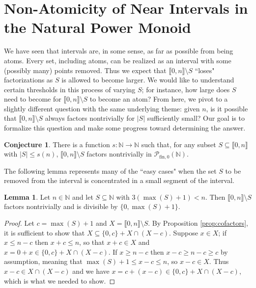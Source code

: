 \documentclass{report}
\newcommand{\NN}{\mathbb{N}}
\renewcommand{\P}{\mathcal{P}}
\newcommand{\llb}{\llbracket}
\newcommand{\rrb}{\rrbracket}
\newcommand{\fin}{\textrm{fin}}
\renewcommand{\:}{\text{:}}
\newcommand{\PN}{{\P_{\fin,0}(\NN)}}
\theoremstyle{definition}
\newtheorem{lemma}[defn]{Lemma}
\newtheorem{conj}[defn]{Conjecture}
\begin{document}

\section{Non-Atomicity of Near Intervals in the Natural Power Monoid} \label{sec:near intervals}

We have seen that intervals are, in some sense, as far as possible from being atoms.
Every set, including atoms, can be realized as an interval with some (possibly many) points removed.  
Thus we expect that $\llb 0,n \rrb \setminus S$ ``loses" factorizations as $S$ is allowed to become larger.  
We would like to understand certain thresholds in this process of varying $S$; for instance, how large does $S$ need to become for $\llb 0,n \rrb \setminus S$ to become an atom?  
From here, we pivot to a slightly different question with the same underlying theme: given $n$, is it possible that $\llb 0,n \rrb \setminus S$ always factors nontrivially for $|S|$ sufficiently small?
Our goal is to formalize this question and make some progress toward determining the answer.

\begin{conj}
There is a function $s:\NN \to \NN$ such that, for any subset $S\subseteq \llb 0,n \rrb$ with $|S| \le s(n)$, $\llb 0,n \rrb \setminus S$ factors nontrivially in $\PN$.
\end{conj}

The following lemma represents many of the ``easy cases" when the set $S$ to be removed from the interval is concentrated in a small segment of the interval.

\begin{lemma}\label{first-third}
Let $n\in \NN$ and let $S\subseteq \NN$ with $3(\max(S)+1)< n$.
Then $\llb 0,n \rrb \setminus S$ factors nontrivially and is divisible by $\{0,\max(S)+1\}$.
\end{lemma}

\begin{proof}
Let $c =  \max(S)+1$ and $X = \llb 0, n \rrb \setminus S$.
By Proposition \ref{prop:cofactors}, it is sufficient to show that $X \subseteq \{0,c\} + X\cap (X-c)$.
Suppose $x\in X$; if $x \le n-c$ then $x + c \le n$, so that $x+c\in X$ and $x = 0 + x \in \{0,c\} + X\cap(X-c)$.
If $x \ge n - c$ then $x - c \ge n - c  \ge c$ by assumption, meaning that $\max(S) + 1 \le x - c \le n$, so $x-c\in X$.
Thus $x-c\in X\cap (X-c)$ and we have $x = c + (x-c) \in \{0,c\} + X\cap (X-c)$, which is what we needed to show.
\end{proof}
\end{document}
